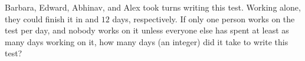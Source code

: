 Barbara, Edward, Abhinav, and Alex took turns writing this test. Working alone, they could finish it in    and $12$ days, respectively. If only one person works on the test per day, and nobody works on it unless everyone else has spent at least as many days working on it, how many days (an integer) did it take to write this test?